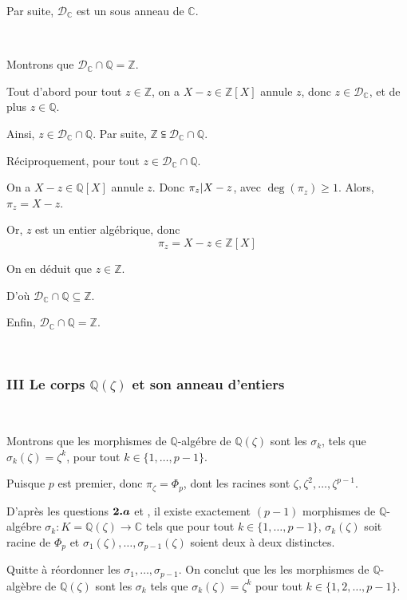 Par suite, $\mathcal{D}_{\mathbb{C}}$ est un sous anneau de $\mathbb{C}$.

\

 Montrons que $\mathcal{D}_{\mathbb{C}} \cap
\mathbb{Q}=\mathbb{Z}$.

Tout d'abord pour tout $z \in \mathbb{Z}$, on a $X - z \in \mathbb{Z} [X]$
annule $z$, donc $z \in \mathcal{D}_{\mathbb{C}}$, et de plus $z \in
\mathbb{Q}$.

Ainsi, $z \in \mathcal{D}_{\mathbb{C}} \cap \mathbb{Q}$. Par suite,
$\mathbb{Z} \subseteqq \mathcal{D}_{\mathbb{C}} \cap \mathbb{Q}$.

R{\'e}ciproquement, pour tout $z \in \mathcal{D}_{\mathbb{C}} \cap
\mathbb{Q}$.

On a $X - z \in \mathbb{Q} [X]$ annule $z$. Donc $\pi_z | X - z $,
avec $\deg (\pi_z) \geqslant 1$. Alors, $\pi_z = X - z$.

Or, $z$ est un entier alg{\'e}brique, donc
\[ \pi_z = X - z \in \mathbb{Z} [X] \]


On en d{\'e}duit que $z \in \mathbb{Z}$.

D'o{\`u} $\mathcal{D}_{\mathbb{C}} \cap \mathbb{Q} \subseteq \mathbb{Z}$.

Enfin, $\mathcal{D}_{\mathbb{C}} \cap \mathbb{Q}=\mathbb{Z}$.

\

\subsubsection*{III Le corps $\mathbb{Q}(\zeta)$ et son anneau d'entiers}

\

Montrons que les morphismes de $\mathbb{Q}$-alg{\'e}bre de
$\mathbb{Q} (\zeta)$ sont les $\sigma_k$, tels que $\sigma_k (\zeta) =
\zeta^k$, pour tout $k \in \{ 1, \ldots, p - 1 \}$.

Puisque $p$ est premier, donc $\pi_{\zeta} = \Phi_p$, dont les racines sont
$\zeta, \zeta^2, \ldots, \zeta^{p - 1}$.

D'apr{\`e}s les questions $\boldsymbol{2. a}$ et , il existe exactement $(p - 1)$ morphismes  de
$\mathbb{Q}$-alg{\'e}bre $\sigma_k : K =\mathbb{Q} (\zeta) \rightarrow
\mathbb{C}$ tels que pour tout $k \in \{ 1, \ldots, p - 1 \}$, $\sigma_k
(\zeta)$ soit racine de $\Phi_p$ et $\sigma_1 (\zeta), \ldots, \sigma_{p - 1}
(\zeta)$ soient deux {\`a} deux distinctes.

Quitte {\`a} r{\'e}ordonner les $\sigma_1, \ldots, \sigma_{p - 1}$. On conclut
que les les morphismes de $\mathbb{Q}$-alg{\`e}bre de $\mathbb{Q} (\zeta)$
sont les $\sigma_k$ tels que $\sigma_k (\zeta) = \zeta^k$ pour tout $k \in \{
1, 2, \ldots, p - 1 \}$.

